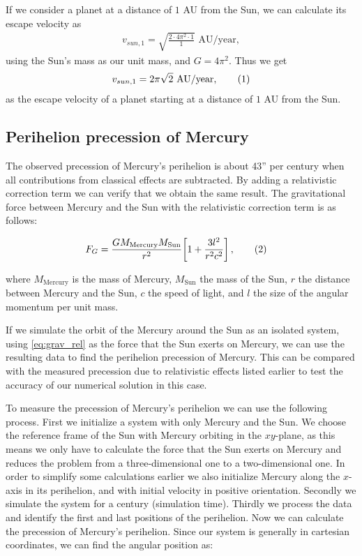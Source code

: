 \documentclass[reprint,english,notitlepage]{revtex4-1}  %
\newcommand\numberthis{\addtocounter{equation}{1}\tag{\theequation}}
\begin{document}
If we consider a planet at a distance of \(1\) AU from the Sun, we can calculate its escape velocity as
\begin{align*}
	v_{sun, 1} = \sqrt{\frac{2\cdot 4\pi^{2}\cdot 1}{1}} \text{ AU/year},
\end{align*}
using the Sun's mass as our unit mass, and \(G = 4\pi^{2}\). Thus we get
\begin{align*}
	v_{sun, 1} = 2\pi\sqrt{2}\text{ AU/year}, \numberthis \label{eq:esc_sun_1au}
\end{align*}
as the escape velocity of a planet starting at a distance of \(1\) AU from the Sun.

\subsection{Perihelion precession of Mercury} \label{sec:II:f}

The observed precession of Mercury's perihelion is about 43'' per century when all contributions from classical effects are subtracted. By adding a relativistic correction term we can verify that we obtain the same result. The gravitational force between Mercury and the Sun with the relativistic correction term is as follows:

\begin{align*}
F_G &= \frac{GM_\text{Mercury} M_\text{Sun}}{r^2} \bigg[ 1 + \frac{3l^2}{r^2 c^2}\bigg] \, , \numberthis \label{eq:grav_rel}
\end{align*}

where $M_\text{Mercury}$ is the mass of Mercury, $M_\text{Sun}$ the mass of the Sun, $r$ the distance between Mercury and the Sun, $c$ the speed of light, and $l$ the size of the angular momentum per unit mass.

If we simulate the orbit of the Mercury around the Sun as an isolated system, using \eqref{eq:grav_rel} as the force that the Sun exerts on Mercury, we can use the resulting data to find the perihelion precession of Mercury. This can be compared with the measured precession due to relativistic effects listed earlier to test the accuracy of our numerical solution in this case.

To measure the precession of Mercury's perihelion we can use the following process. First we initialize a system with only Mercury and the Sun. We choose the reference frame of the Sun with Mercury orbiting in the $xy$-plane, as this means we only have to calculate the force that the Sun exerts on Mercury and reduces the problem from a three-dimensional one to a two-dimensional one. In order to simplify some calculations earlier we also initialize Mercury along the $x$-axis in its perihelion, and with initial velocity in positive orientation. Secondly we simulate the system for a century (simulation time). Thirdly we process the data and identify the first and last positions of the perihelion. Now we can calculate the precession of Mercury's perihelion. Since our system is generally in cartesian coordinates, we can find the angular position as:
\end{document}
